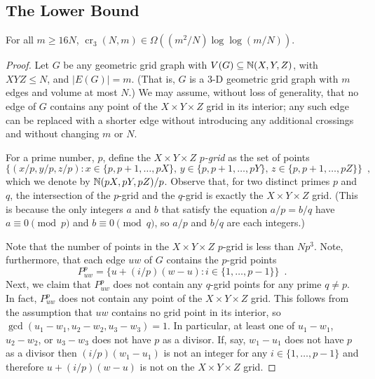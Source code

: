 \documentclass{patmorin}
\newcommand{\n}{N}
\DeclareMathOperator{\crs}{cr}
\begin{document}
\subsection{The Lower Bound}

\begin{thm}
  For all $m\ge 16\n$, $\crs_3(\n,m) \in \Omega((m^2/\n)\log\log (m/\n))$.
\end{thm}

\begin{proof}
  Let $G$ be any geometric grid graph with $V(G)\subseteq\mathbb{N}(X,Y,Z)$,
  with $XYZ\le\n$, and $|E(G)|=m$. (That is, $G$ is a 3-D geometric
  grid graph with $m$ edges and volume at most $\n$.)  We may assume,
  without loss of generality, that no edge of $G$ contains any point
  of the $X\times Y\times Z$ grid in its interior; any such edge can
  be replaced with a shorter edge without introducing any additional
  crossings and without changing $m$ or $\n$.

  For a prime number, $p$, define the $X\times Y\times Z$ \emph{$p$-grid}
  as the set of points
  \[
    \{(x/p,y/p,z/p): x\in\{p,p+1,\ldots,pX\},\,
    y\in\{p,p+1,\ldots,pY\},\, z\in\{p,p+1,\ldots,pZ\}\} \enspace ,
  \]
  which we denote by $\mathbb{N}(pX,pY,pZ)/p$.
  Observe that, for two distinct primes $p$ and $q$, the intersection
  of the $p$-grid and the $q$-grid is exactly the $X\times Y\times Z$
  grid. (This is because the only integers $a$ and $b$ that satisfy the
  equation $a/p = b/q$ have $a\equiv 0 \pmod{p}$ and $b\equiv 0\pmod q$,
  so $a/p$ and $b/q$ are each integers.)

  Note that the number of points in the $X\times Y\times Z$ $p$-grid is
  less than $\n p^3$.  Note, furthermore, that each edge $uw$ of $G$
  contains the $p$-grid points
  \[
      P_{uw}^p = \{ u+(i/p)(w-u) : i\in\{1,\ldots,p-1\} \} \enspace .
  \]
  Next, we claim that $P_{uw}^p$ does not contain any $q$-grid points for
  any prime $q\neq p$.  In fact, $P_{uw}^p$ does not contain any point
  of the $X\times Y\times Z$ grid.  This follows from the assumption that
  $uw$ contains no grid point in its interior, so $\gcd(u_1-w_1, u_2-w_2,
  u_3-w_3)=1$.  In particular, at least one of $u_1-w_1$, $u_2-w_2$,
  or $u_3-w_3$ does not have $p$ as a divisor.  If, say, $w_1-u_1$ does
  not have $p$ as a divisor then $(i/p)(w_1-u_1)$ is not an integer for
  any $i\in\{1,\ldots,p-1\}$ and therefore $u+(i/p)(w-u)$ is not on the
  $X\times Y\times Z$ grid.


\end{proof}
\end{document}
